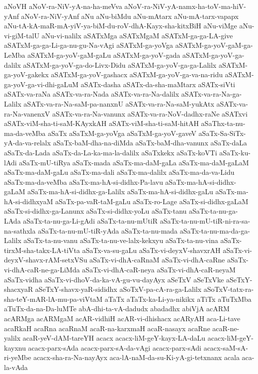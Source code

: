 {aNoVH
aNoV-ra-NiV-yA-na-ha-meVva
aNoV-ra-NiV-yA-namx-ha-toV-ma-hiV-yAnf
aNoV-ra-NiV-yAnf
aNu
aNu-biMdu
aNu-mAtarx
aNu-mA-tarx-vapapx
aNu-tA-kA-maR-mA-yiV-ya-biM-du-roV-dhA-Kayx-sha-kitxBiH
aNu-viMge
aNu-vi-giM-talU
aNu-vi-nalilx
aSATxMga
aSATxMgaM
aSATxM-ga-ga-LA-give
aSATxM-ga-ga-Li-ga-nu-gu-Na-vAgi
aSATxM-ga-yoVga
aSATxM-ga-yoV-gaM-ga-LeMba
aSATxM-ga-yoV-gaM-gaLu
aSATxM-ga-yoV-gada
aSATxM-ga-yoV-ga-dalilx
aSATxM-ga-yoV-ga-do-Livx-Didu
aSATxM-ga-yoV-ga-ga-Lalilx
aSATxM-ga-yoV-gakekx
aSATxM-ga-yoV-gashacx
aSATxM-ga-yoV-ga-va-na-ridu
aSATxM-ga-yoV-ga-vi-dhi-gaLuM
aSATx-dasha
aSATx-da-sha-maMtarx
aSATx-siVti
aSATx-va-raNa
aSATx-va-ra-Nada
aSATx-va-ra-Na-dalilx
aSATx-va-ra-Na-ga-Lalilx
aSATx-va-ra-Na-saM-pa-nanxnU
aSATx-va-ra-Na-saM-yukAtx
aSATx-va-ra-Na-vanenxV
aSATx-va-ra-Na-vanunx
aSATx-va-ra-NoV-dadhx-raNe
aSATxvi
aSATx-viM-sha-ti-saM-KAyxkAH
aSATx-viM-sha-ti-saM-hitAH
aSaThx-ta-nu-ma-da-veMba
aSaTx
aSaTxM-ga-yoVga
aSaTxM-ga-yoV-gaveV
aSaTx-Sa-SiTx-yA-da-va-relalx
aSaTx-baM-dha-na-diMda
aSaTx-baM-dha-vanunx
aSaTx-daLa
aSaTx-da-Lada
aSaTx-da-La-ka-ma-la-dalilx
aSaTxkekx
aSaTx-koVTi
aSaTx-ku-lAdi
aSaTx-mU-tiRya
aSaTx-mada
aSaTx-ma-daM-gaLa
aSaTx-ma-daM-gaLaM
aSaTx-ma-daM-gaLu
aSaTx-ma-dali
aSaTx-ma-dalilx
aSaTx-ma-da-va-Lidu
aSaTx-ma-da-veMba
aSaTx-ma-hA-si-didhx-Pa-lavu
aSaTx-ma-hA-si-didhx-gaLaM
aSaTx-ma-hA-si-didhx-ga-Lalilx
aSaTx-ma-hA-si-didhx-gaLu
aSaTx-ma-hA-si-didhxyaM
aSaTx-pa-vaR-taM-gaLu
aSaTx-ro-Lage
aSaTx-si-didhx-gaLaM
aSaTx-si-didhx-ga-Lanunx
aSaTx-si-didhx-yoLu
aSaTx-tanu
aSaTx-ta-nu-ga-LAda
aSaTx-ta-nu-ga-Li-gAdi
aSaTx-ta-nu-mUtiR
aSaTx-ta-nu-mU-tiR-ni-ra-sa-na-sathxla
aSaTx-ta-nu-mU-tiR-yAda
aSaTx-ta-nu-mada
aSaTx-ta-nu-ma-da-ga-Lalilx
aSaTx-ta-nu-vanu
aSaTx-ta-nu-ve-lalx-kekxyu
aSaTx-ta-nu-vina
aSaTx-tirxM-sha-takx-LA-tiVta
aSaTx-va-su-gaLu
aSaTx-vi-deyxV-shavxrAH
aSaTx-vi-deyxV-shavx-rAM-setxVSu
aSaTx-vi-dhA-caRnaM
aSaTx-vi-dhA-caRne
aSaTx-vi-dhA-caR-ne-ga-LiMda
aSaTx-vi-dhA-caR-neya
aSaTx-vi-dhA-caR-neyaM
aSaTx-vidha
aSaTx-vi-dhoV-da-ka-vA-gu-vu-dayAyx
aSeTxV
aSeTxVke
aSeTxY-shacxyaR
aSeTxY-shavx-yaR-sididhx
aSoTxV-pa-cA-ra-ga-Lalilx
aSoTxV-tatx-ra-sha-teY-mAR-lA-mu-pa-viVtaM
aTaTx
aTaTx-ka-Li-ya-nikikx
aTiTx
aTuTxMba
aTuTx-da-na-Da-luMTe
abA-dhi-ta-vA-dadudx
abadadhx
abiVjA
acARM
acARMga
acARMgaM
acAR-vidhiH
acAR-vi-dhishacx
acARyAH
aca-Li-tave
acaRkaH
acaRna
acaRnaM
acaR-na-karxmaH
acaR-nasayx
acaRne
acaR-ne-yalilx
acaR-yeV-dAM-tareYH
acacx
acacx-liM-geY-kayx-LA-daLu
acacx-liM-geY-kayxnu
acacx-parx-sAda
acacx-parx-sA-da-vAgi
acacx-parx-sAdi
acacx-saM-sA-ri-yeMbe
acacx-sha-ra-Na-nayAyx
aca-lA-naM-da-su-Ki-yA-gi-tetxnanx
acala
aca-la-vAda
}
